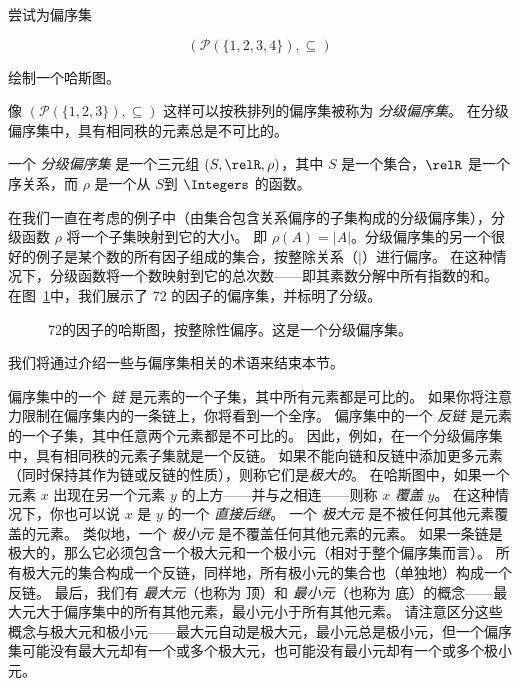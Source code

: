 \begin{exer}
尝试为偏序集

\[ ({\mathcal P}(\{1,2,3,4\}),\subseteq) \]

绘制一个哈斯图。
\end{exer}

像 $({\mathcal P}(\{1,2,3\}), \subseteq)$ 这样可以按秩排列的偏序集被称为  \emph{分级偏序集}。
在分级偏序集中，具有相同秩的元素总是不可比的。

\begin{defi}
一个 \emph{分级偏序集} 是一个三元组 $(S, \relR, \rho)$，其中 $S$ 是一个集合，$\relR$ 是一个序关系，而 $\rho$ 是一个从 $S$到 $\Integers$ 的函数。
\end{defi}

在我们一直在考虑的例子中（由集合包含关系偏序的子集构成的分级偏序集），分级函数 $\rho$ 将一个子集映射到它的大小。
即 $\rho(A) = |A|$。分级偏序集的另一个很好的例子是某个数的所有因子组成的集合，按整除关系（$\mid$）进行偏序。
在这种情况下，分级函数将一个数映射到它的总次数——即其素数分解中所有指数的和。
在图~\ref{fig:divisors_of_72}中，我们展示了 $72$ 的因子的偏序集，并标明了分级。

\begin{figure}[!hbtp]

\caption[72的因子的哈斯图。]{72的因子的哈斯图，按整除性偏序。这是一个分级偏序集。}
\label{fig:divisors_of_72} 
\end{figure}

我们将通过介绍一些与偏序集相关的术语来结束本节。

偏序集中的一个 \emph{链} 是元素的一个子集，其中所有元素都是可比的。
如果你将注意力限制在偏序集内的一条链上，你将看到一个全序。
偏序集中的一个 \emph{反链} 是元素的一个子集，其中任意两个元素都是不可比的。
因此，例如，在一个分级偏序集中，具有相同秩的元素子集就是一个反链。
如果不能向链和反链中添加更多元素（同时保持其作为链或反链的性质），则称它们是\emph{极大的}。
在哈斯图中，如果一个元素 $x$ 出现在另一个元素 $y$ 的上方——并与之相连——则称 $x$ \emph{覆盖} $y$。
在这种情况下，你也可以说 $x$ 是 $y$ 的一个 \emph{直接后继}。
一个 \emph{极大元} 是不被任何其他元素覆盖的元素。
类似地，一个 \emph{极小元} 是不覆盖任何其他元素的元素。
如果一条链是极大的，那么它必须包含一个极大元和一个极小元（相对于整个偏序集而言）。
所有极大元的集合构成一个反链，同样地，所有极小元的集合也（单独地）构成一个反链。
最后，我们有 \emph{最大元}（也称为 顶）和 \emph{最小元}（也称为 底）的概念——最大元大于偏序集中的所有其他元素，最小元小于所有其他元素。
请注意区分这些概念与极大元和极小元——最大元自动是极大元，最小元总是极小元，但一个偏序集可能没有最大元却有一个或多个极大元，也可能没有最小元却有一个或多个极小元。


